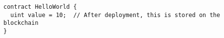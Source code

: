 \begin{lstlisting}[language=Solidity]
contract HelloWorld {
  uint value = 10;  // After deployment, this is stored on the blockchain
}
\end{lstlisting}